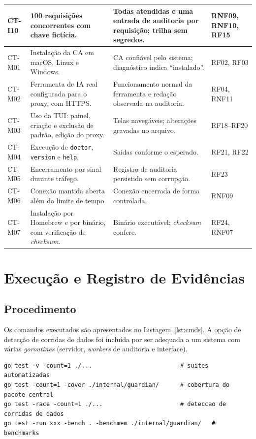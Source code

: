 \begin{table}[htb]
\begin{tabular}{|p{1.35cm}|p{4.4cm}|p{5.6cm}|p{2.3cm}|}
CT-I10 & 100 requisições concorrentes com chave fictícia. & Todas atendidas e uma entrada de auditoria por requisição; trilha sem segredos. & RNF09, RNF10, RF15 \\ \hline
CT-M01 & Instalação da CA em macOS, Linux e Windows. & CA confiável pelo sistema; diagnóstico indica ``instalado''. & RF02, RF03 \\ \hline
CT-M02 & Ferramenta de IA real configurada para o proxy, com HTTPS. & Funcionamento normal da ferramenta e redação observada na auditoria. & RF04, RNF11 \\ \hline
CT-M03 & Uso da TUI: painel, criação e exclusão de padrão, edição do proxy. & Telas navegáveis; alterações gravadas no arquivo. & RF18--RF20 \\ \hline
CT-M04 & Execução de \texttt{doctor}, \texttt{version} e \texttt{help}. & Saídas conforme o esperado. & RF21, RF22 \\ \hline
CT-M05 & Encerramento por sinal durante tráfego. & Registro de auditoria persistido sem corrupção. & RF23 \\ \hline
CT-M06 & Conexão mantida aberta além do limite de tempo. & Conexão encerrada de forma controlada. & RNF09 \\ \hline
CT-M07 & Instalação por Homebrew e por binário, com verificação de \textit{checksum}. & Binário executável; \textit{checksum} confere. & RF24, RNF07 \\ \hline
\end{tabular}
\end{table}

\section{Execução e Registro de Evidências}
\label{sec:test_exec}

\subsection{Procedimento}

Os comandos executados são apresentados no Listagem~\ref{lst:cmds}. A opção de detecção de corridas de dados foi incluída por ser adequada a um sistema com várias \textit{goroutines} (servidor, \textit{workers} de auditoria e interface).

\begin{lstlisting}[basicstyle=\ttfamily\scriptsize, frame=single, caption={Comandos de execução dos testes}, label={lst:cmds}, captionpos=t, breaklines=true]
go test -v -count=1 ./...                         # suites automatizadas
go test -count=1 -cover ./internal/guardian/      # cobertura do pacote central
go test -race -count=1 ./...                      # deteccao de corridas de dados
go test -run xxx -bench . -benchmem ./internal/guardian/   # benchmarks
\end{lstlisting}

